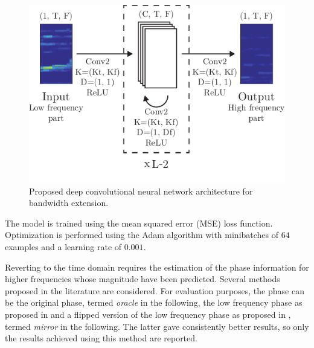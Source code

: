 \documentclass{article}
\begin{document}
\begin{figure}[t]
    \centering
    \includegraphics[width=\columnwidth]{figures/mdl.pdf}
    \caption{Proposed deep convolutional neural network architecture for bandwidth extension.}\label{fig:mdl}
    \vspace{-2mm}
\end{figure}

The model is trained using the mean squared error (MSE) loss function. Optimization is performed using the Adam \cite{kingma2014adam} algorithm with minibatches of $64$ examples and a learning rate of $0.001$.


Reverting to the time domain requires the estimation of the phase information for higher frequencies whose magnitude have been predicted. Several methods proposed in the literature are considered. For evaluation purposes, the phase can be the original phase, termed \textit{oracle} in the following, the low frequency phase as proposed in \cite{miron2018high} and a flipped version of the low frequency phase as proposed in \cite{li2015deep}, termed \textit{mirror} in the following. The latter gave consistently better results, so only the results achieved using this method are reported.
\end{document}
